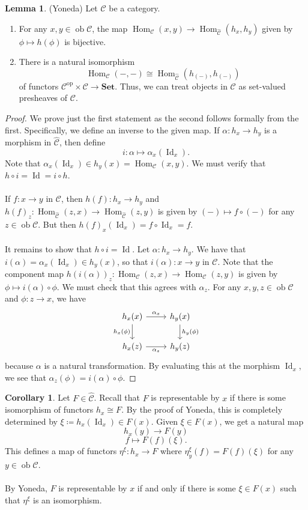 \documentclass[10pt,letterpaper,cm]{nupset}
\theoremstyle{definition}
\newtheorem{corollary}{Corollary}
\newtheorem{lemma}{Lemma}
\newcommand{\1}{\mathbf{1}}
\renewcommand{\c}{\mathscr{C}}
\newcommand{\0}{\vec 0}
\DeclareMathOperator{\id}{Id}
\DeclareMathOperator{\op}{op}
\DeclareMathOperator{\ob}{ob}
\DeclareMathOperator{\Hom}{Hom}
\begin{document}
\begin{lemma}{(Yoneda)} Let $\c$ be a category.
\begin{enumerate}
\item For any $x, y \in \ob \c$, the map $\Hom_{\c}(x, y) \to \Hom_{\widehat{\c}}(h_x, h_y)$ given by $\phi \mapsto h(\phi)$ is bijective.
\item There is a natural isomorphism $$\Hom_{\c}(-, -) \cong \Hom_{\widehat{\c}}(h_{(-)}, h_{(-)})$$ of functors $ \c^{\op} \times \c \to \mathbf{Set}$. Thus, we can treat objects in $\c$ as set-valued presheaves of $\c$.
\end{enumerate}
\end{lemma}
\begin{proof}
We prove just the first statement as the second follows formally from the first.
Specifically, we define an inverse to the given map. If $\alpha : h_x \to h_y$ is a morphism in $\widehat{\c}$, then define $$i : \alpha \mapsto \alpha_x(\id_x).$$ Note that $\alpha_x(\id_x) \in h_y(x) = \Hom_{\c}(x,y)$. We must verify that $h \circ i = \id = i \circ h$.
\\ \\ If $f: x \to y$ in $\c$, then $h(f) : h_x \to h_y$ and $h(f)_z : \Hom_{\widehat{\c}}(z, x) \to \Hom_{\widehat{\c}}(z, y)$ is given by $(-) \mapsto f \circ (-)$ for any $z\in \ob \c$. But then $h(f)_x(\id_x) = f\circ \id_x = f$.
\\ \\ It remains to show that $h \circ i = \id$. Let $\alpha : h_x \to h_y$.  We have that $
i(\alpha) = \alpha_x(\id_x) \in h_y(x)$, so that $i(\alpha) : x \to y$ in $\c$. Note that the component map $h(i(\alpha))_z : \Hom_{\c}(z, x) \to \Hom_{\c}(z, y)$ is given by $\phi \mapsto i(\alpha) \circ \phi.$ We must check that this agrees with $\alpha_z$. For any $x, y, z \in \ob \c$ and $\phi : z \to x$, we have
\[
\begin{tikzcd}
h_x(x) \arrow[r, "\alpha_x"] \arrow[d, "h_x(\phi)"'] & h_y(x) \arrow[d, "h_y(\phi)"] \\
h_x(z) \arrow[r, "\alpha_z"'] & h_y(z)
\end{tikzcd}
\]
because $\alpha$ is a natural transformation. By evaluating this at the morphism $\id_x$, we see that $\alpha_z(\phi) = i(\alpha) \circ \phi$.
\end{proof}

\begin{corollary}
Let $F \in \widehat{\c}$. Recall that $F$ is representable by $x$ if there is some isomorphism of functors $h_x \cong F$. By the proof of Yoneda, this is completely determined by $\xi\coloneqq h_x(\id_x) \in F(x)$. Given $\xi \in F(x)$, we get a natural map $$h_x(y) \to F(y)$$ $$ f \mapsto F(f)(\xi).$$ This defines a map of functors $\eta^{\xi} : h_x \to F$ where $\eta^{\xi}_y(f) = F(f)(\xi)$ for any $y \in \ob \c$. 
\\ \\ By Yoneda, $F$ is representable by $x$ if and only if there is some $\xi \in F(x)$ such that $\eta^{\xi}$ is an isomorphism. 
\end{corollary}
\end{document}
